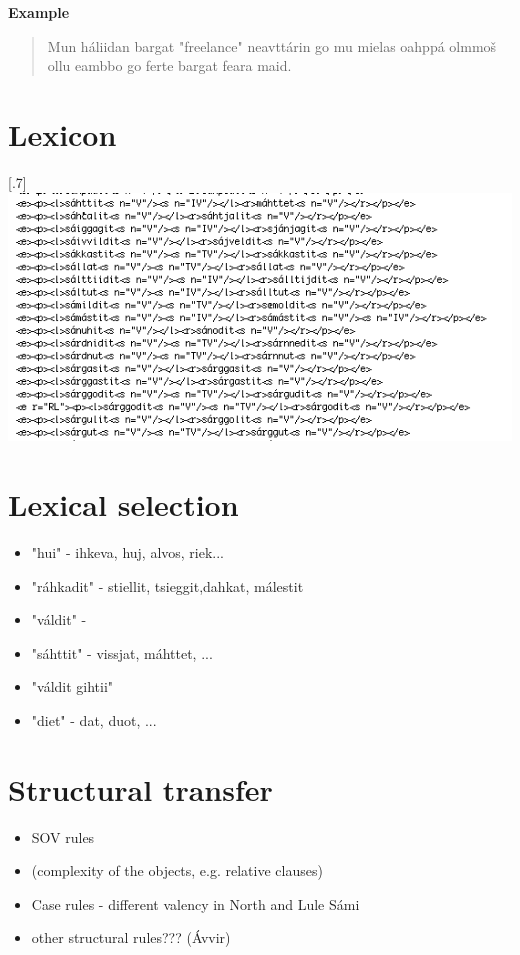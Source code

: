 \documentclass[a4paper,english,12pt]{article}
\begin{document}
\begin{spacing}{1.0}
\textbf{Example}
\begin{quote}
Mun háliidan bargat "freelance" neavttárin go mu mielas oahppá olmmoš ollu eambbo go ferte bargat feara maid.
\end{quote}



\section{Lexicon}

\scalebox{.7}[.7]{\includegraphics{bidix.png}}


\section{Lexical selection}
\begin{itemize}
\item "hui" - ihkeva, huj, alvos, riek...
\item "ráhkadit" - stiellit, tsieggit,dahkat, málestit
\item "váldit" - 
\item "sáhttit" - vissjat, máhttet, ...
\item "váldit gihtii" 
\item "diet" - dat, duot, ...
\end{itemize}


\section{Structural transfer} 
\begin{itemize}
  \item SOV rules
  \item (complexity of the objects, e.g. relative clauses)
  \item Case rules - different valency in North and Lule Sámi
  \item other structural rules??? (Ávvir)
\end{itemize}



\end{spacing}
\end{document}
